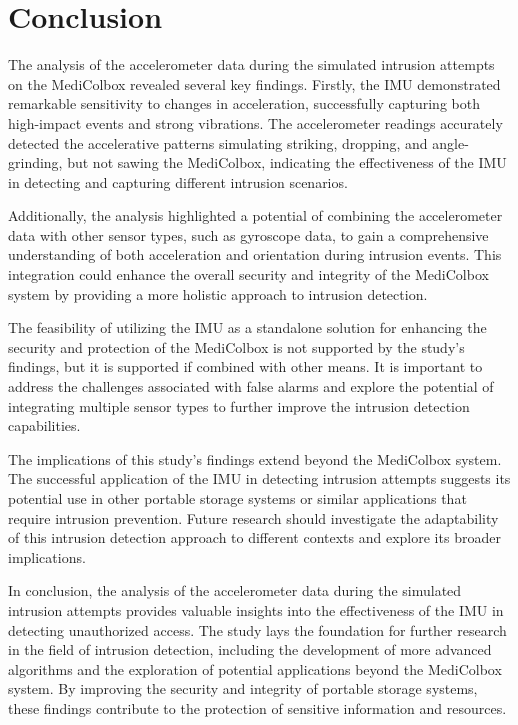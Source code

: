 \documentclass[../main.tex]{subfiles}
\begin{document}
\section{Conclusion}
The analysis of the accelerometer data during the simulated intrusion attempts on the MediColbox revealed several key findings. Firstly, the IMU demonstrated remarkable sensitivity to changes in acceleration, successfully capturing both high-impact events and strong vibrations. The accelerometer readings accurately detected the accelerative patterns simulating striking, dropping, and angle-grinding, but not sawing the MediColbox, indicating the effectiveness of the IMU in detecting and capturing different intrusion scenarios.


Additionally, the analysis highlighted a potential of combining the accelerometer data with other sensor types, such as gyroscope data, to gain a comprehensive understanding of both acceleration and orientation during intrusion events. This integration could enhance the overall security and integrity of the MediColbox system by providing a more holistic approach to intrusion detection.

The feasibility of utilizing the IMU as a standalone solution for enhancing the security and protection of the MediColbox is not supported by the study's findings, but it is supported if combined with other means. It is important to address the challenges associated with false alarms and explore the potential of integrating multiple sensor types to further improve the intrusion detection capabilities.

The implications of this study's findings extend beyond the MediColbox system. The successful application of the IMU in detecting intrusion attempts suggests its potential use in other portable storage systems or similar applications that require intrusion prevention. Future research should investigate the adaptability of this intrusion detection approach to different contexts and explore its broader implications.

In conclusion, the analysis of the accelerometer data during the simulated intrusion attempts provides valuable insights into the effectiveness of the IMU in detecting unauthorized access. The study lays the foundation for further research in the field of intrusion detection, including the development of more advanced algorithms and the exploration of potential applications beyond the MediColbox system. By improving the security and integrity of portable storage systems, these findings contribute to the protection of sensitive information and resources.
\end{document}
